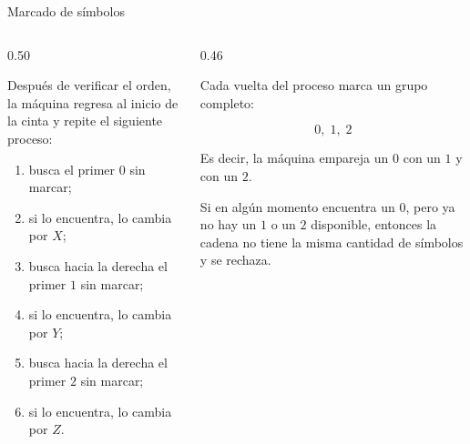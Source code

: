 \documentclass[aspectratio=1610, 12pt]{beamer}
\begin{document}
\begin{frame}[t]{Marcado de símbolos}
\vspace{4pt}
\begin{columns}[T]

  \begin{column}{0.50\textwidth}
    \begin{defbox}
      \footnotesize
      Después de verificar el orden, la máquina regresa al inicio
      de la cinta y repite el siguiente proceso:

      \begin{enumerate}\setlength{\itemsep}{4pt}
        \item busca el primer $0$ sin marcar;

        \item si lo encuentra, lo cambia por $X$;

        \item busca hacia la derecha el primer $1$ sin marcar;

        \item si lo encuentra, lo cambia por $Y$;

        \item busca hacia la derecha el primer $2$ sin marcar;

        \item si lo encuentra, lo cambia por $Z$.
      \end{enumerate}
    \end{defbox}
  \end{column}

  \begin{column}{0.46\textwidth}
    \begin{exbox}[Interpretación]
      \footnotesize
      Cada vuelta del proceso marca un grupo completo:

      \[
        0,\;1,\;2
      \]

      \vspace{4pt}
      Es decir, la máquina empareja un $0$ con un $1$ y con un $2$.

      \vspace{4pt}
      Si en algún momento encuentra un $0$, pero ya no hay un $1$
      o un $2$ disponible, entonces la cadena no tiene la misma
      cantidad de símbolos y se rechaza.
    \end{exbox}
  \end{column}

\end{columns}
\end{frame}
\end{document}
